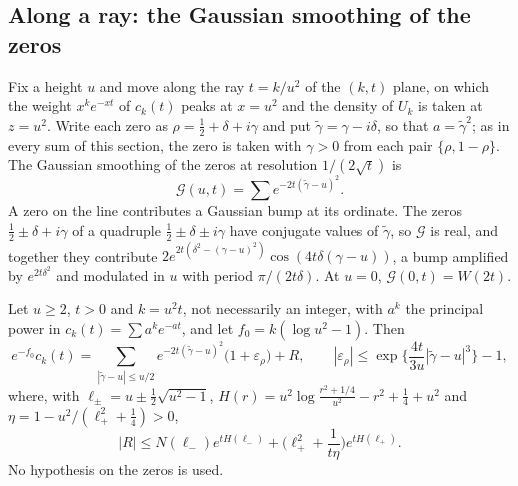 \subsection{Along a ray: the Gaussian smoothing of the zeros}\label{sec:ch12:ray}

Fix a height $u$ and move along the ray $t=k/u^2$ of the $(k,t)$ plane, on which the weight $x^ke^{-xt}$ of $c_k(t)$ peaks at $x=u^2$ and the density of $U_k$ is taken at $z=u^2$. Write each zero as $\rho=\frac12+\delta+i\gamma$ and put $\tilde\gamma=\gamma-i\delta$, so that $a=\tilde\gamma^2$; as in every sum of this section, the zero is taken with $\gamma>0$ from each pair $\{\rho,1-\rho\}$. The Gaussian smoothing of the zeros at resolution $1/(2\sqrt t)$ is
\[
\mathcal G(u,t)=\sum e^{-2t(\tilde\gamma-u)^2}.
\]
A zero on the line contributes a Gaussian bump at its ordinate. The zeros $\frac12\pm\delta+i\gamma$ of a quadruple $\frac12\pm\delta\pm i\gamma$ have conjugate values of $\tilde\gamma$, so $\mathcal G$ is real, and together they contribute $2e^{2t(\delta^2-(\gamma-u)^2)}\cos(4t\delta(\gamma-u))$, a bump amplified by $e^{2t\delta^2}$ and modulated in $u$ with period $\pi/(2t\delta)$. At $u=0$, $\mathcal G(0,t)=W(2t)$.

\begin{proposition}\label{prop:ch12:ray}
Let $u\ge2$, $t>0$ and $k=u^2t$, not necessarily an integer, with $a^k$ the principal power in $c_k(t)=\sum a^ke^{-at}$, and let $f_0=k(\log u^2-1)$. Then
\[
e^{-f_0}c_k(t)=\sum_{|\tilde\gamma-u|\le u/2}e^{-2t(\tilde\gamma-u)^2}\big(1+\varepsilon_\rho\big)+R,\qquad |\varepsilon_\rho|\le\exp\Big\{\frac{4t}{3u}|\tilde\gamma-u|^3\Big\}-1,
\]
where, with $\ell_\pm=u\pm\frac12\sqrt{u^2-1}$, $H(r)=u^2\log\frac{r^2+1/4}{u^2}-r^2+\frac14+u^2$ and $\eta=1-u^2/(\ell_+^2+\frac14)>0$,
\[
|R|\le N(\ell_-)e^{tH(\ell_-)}+\Big(\ell_+^2+\frac1{t\eta}\Big)e^{tH(\ell_+)}.
\]
No hypothesis on the zeros is used.
\end{proposition}

